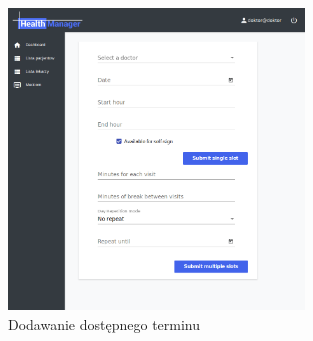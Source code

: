 \documentclass[polish,12pt]{aghthesis}
\begin{document}
{\begin{figure}[H]
          \includegraphics[width=0.7\textwidth]{gui-add-timeslot}
          \caption{Dodawanie dostępnego terminu}
        \end{figure}     
    }
\listoffigures 
\listoftables

\nocite{artykul2011,ksiazka2011,narzedzie2011,projekt2011}


\end{document}
